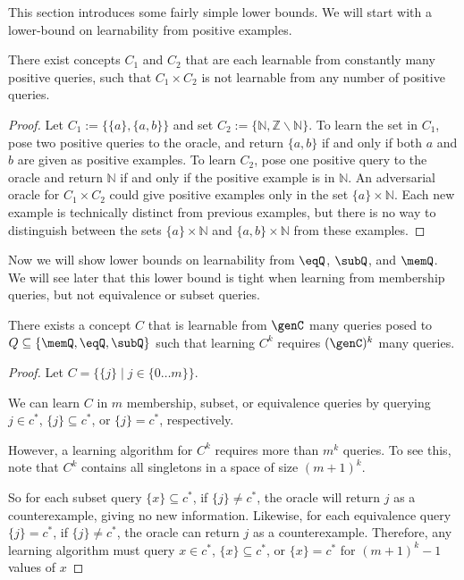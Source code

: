 This section introduces some fairly simple lower bounds.
We will start with a lower-bound on learnability from positive examples. 

\begin{proposition}
There exist concepts $C_1$ and $C_2$ that are each learnable from constantly many positive queries, such that $C_1 \times C_2$ is not learnable from any number of positive queries. 
\end{proposition}
\begin{proof}
Let $C_1 := \{ \{a\}, \{a,b\} \}$ and set $C_2 := \{ \mathbb{N}, \mathbb{Z} \backslash \mathbb{N} \}$. 
To learn the set in $C_1$, pose two positive queries to the oracle, and return $\{a,b\}$ if and only if both $a$ and $b$ are given as positive examples. 
To learn $C_2$, pose one positive query to the oracle and return $\mathbb{N}$ if and only if the positive example is in $\mathbb{N}$. 
An adversarial oracle for $C_1 \times C_2$ could give positive examples only in the set $\{a\} \times \mathbb{N}$. 
Each new example is technically distinct from previous examples, but there is no way to distinguish between the sets $\{a\}\times \mathbb{N}$ and $\{a,b\} \times \mathbb{N}$ from these examples. 
\end{proof}

Now we will show lower bounds on learnability from $\eqQ$, $\subQ$, and $\memQ$. 
We will see later that this lower bound is tight when learning from membership queries, but not equivalence or subset queries.


\begin{proposition}
There exists a concept $C$ that is learnable from $\genC$ many queries posed to $Q \subseteq \{ \memQ, \eqQ, \subQ \}$ such that learning $C^k$ requires $(\genC)^k$ many queries.   
\end{proposition}
\begin{proof}
Let $C = \{ \{j\} \mid j \in \{0 \dots m\} \}$. 

We can learn $C$ in $m$ membership, subset, or equivalence queries by querying $j \in c^*$, $\{ j \} \subseteq c^*$, or $\{j\} = c^*$, respectively. 

However, a learning algorithm for $C^k$ requires more than $m^k$ queries. 
To see this, note that  $C^k$ contains all singletons in a space of size $(m+1)^k$. 

So for each subset query $\{x\} \subseteq c^*$, if $\{j\} \ne c^*$, the oracle will return $j$ as a counterexample, giving no new information.  
Likewise, for each equivalence query $\{j\} = c^*$, if $\{j\} \ne c^*$, the oracle can return $j$ as a counterexample.
Therefore, any learning algorithm must query $x \in c^*$, $\{ x \} \subseteq c^*$, or $\{x\} = c^*$ for $(m+1)^k - 1$ values of $x$
\end{proof}
